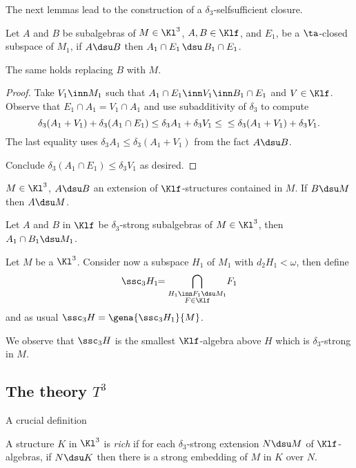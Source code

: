 The next lemmas lead to the construction of a $\delta_{3}$-selfsufficient closure.
\begin{lem}
Let $A$ and $B$ be subalgebras of $M\in\Kl^{3}$, $A,B\in\Klf$, and $E_{1}$, be a $\ta$-closed subspace of $M_{1}$,
if $A\dsu B$ then $A_{1}\cap E_{1}\,\dsu\,B_{1}\cap E_{1}$.

The same holds replacing $B$ with $M$.
\end{lem}
\begin {proof}
Take $V_{1}\inn M_{1}$ such that $A_{1}\cap E_{1}\inn V_{1}\inn B_{1}\cap E_{1}$ and $V\in\Klf$.
Observe that $E_{1}\cap A_{1}=V_{1}\cap A_{1}$ and use subadditivity of $\delta_{3}$ to compute
$$
\delta_{3}(A_{1}+V_{1})+\delta_{3}(A_{1}\cap E_{1})\leq\delta_{3}A_{1}+\delta_{3}V_{1}\leq\\
\leq\delta_{3}%
(A_{1}+V_{1})+\delta_{3}V_{1}.
$$
The last equality uses $\delta_{3}A_{1}\leq\delta_{3}(A_{1}+V_{1})$ from
the fact $A\dsu B$. %

Conclude $\delta_{3}(A_{1}\cap E_{1})\leq\delta_{3}V_{1}$ as desired.
\end{proof}
\begin{cor}
$M\in\Kl^{3}$, $A\dsu B$ an extension of $\Klf$-structures contained in $M$.
If $B\dsu M$ then $A\dsu M$.
\end{cor}
\begin{cor}
Let $A$ and $B$ in $\Klf$ be $\delta_{3}$-strong subalgebras of $M\in\Kl^{3}$,
then  $A_{1}\cap B_{1}\dsu M_{1}$.
\end{cor}

Let $M$ be a $\Kl^{3}$. Consider now a subspace $H_{1}$ of $M_{1}$ with $d_{2}H_{1}<\omega$, then define
$$\ssc_{3}H_{1}\!\!=\bigcap_{\substack{H_{1}\inn F_{1}\dsu M_{1}\\ F\in\Klf}}\!F_{1}$$
and as usual $\ssc_{3}H=\gena{\ssc_{3}H_{1}}{M}$.

We observe that $\ssc_{3}H$ is the smallest $\Klf$-algebra above $H$ which is $\delta_{3}$-strong
in $M$.

\subsection{The theory $T^{3}$}
A crucial definition
\begin{dfn}
A structure $K$ in $\Kl^{3}$ is \emph{rich} if for each $\delta_{3}$-strong extension $N\dsu M$ of
$\Klf$-algebras, if $N\dsu K$ then there is a strong embedding of $M$ in $K$ over $N$.
\end{dfn}

